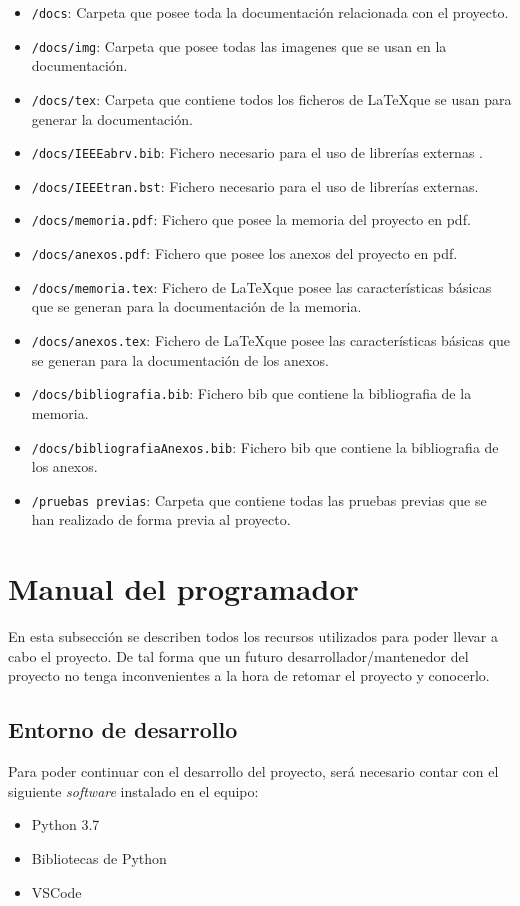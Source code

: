\begin{itemize}
    \item \texttt{/docs}: Carpeta que posee toda la documentación relacionada con el proyecto.
    \item \texttt{/docs/img}: Carpeta que posee todas las imagenes que se usan en la documentación.
    \item \texttt{/docs/tex}: Carpeta que contiene todos los ficheros de \LaTeX que se usan para generar la documentación.
    \item \texttt{/docs/IEEEabrv.bib}: Fichero necesario para el uso de librerías externas .
    \item \texttt{/docs/IEEEtran.bst}: Fichero necesario para el uso de librerías externas.
    \item \texttt{/docs/memoria.pdf}: Fichero que posee la memoria del proyecto en pdf.
    \item \texttt{/docs/anexos.pdf}: Fichero que posee los anexos del proyecto en pdf.
    \item \texttt{/docs/memoria.tex}: Fichero de \LaTeX que posee las características básicas que se generan para la documentación de la memoria.
    \item \texttt{/docs/anexos.tex}: Fichero de \LaTeX que posee las características básicas que se generan para la documentación de los anexos.
    \item \texttt{/docs/bibliografia.bib}: Fichero bib que contiene la bibliografia de la memoria.
    \item \texttt{/docs/bibliografiaAnexos.bib}: Fichero bib que contiene la bibliografia de los anexos. 
\end{itemize}

\begin{itemize}
    \item \texttt{/pruebas previas}: Carpeta que contiene todas las pruebas previas que se han realizado de forma previa al proyecto.
\end{itemize}

\section{Manual del programador}
En esta subsección se describen todos los recursos utilizados para poder llevar a cabo el proyecto.
De tal forma que un futuro desarrollador/mantenedor del proyecto no tenga inconvenientes a la hora de retomar el proyecto y conocerlo.

\subsection{Entorno de desarrollo}
Para poder continuar con el desarrollo del proyecto, será necesario contar con el siguiente \textit{software} instalado en el equipo:
\begin{itemize}
    \tightlist
    \item Python 3.7
    \item Bibliotecas de Python
    \item VSCode
    
\end{itemize}


